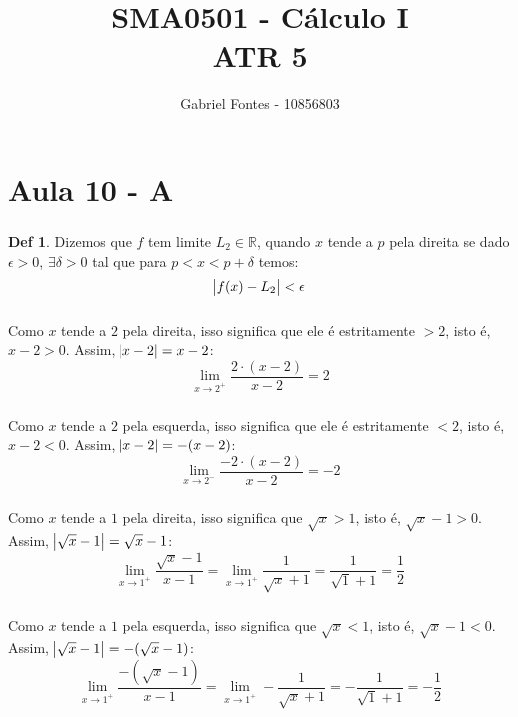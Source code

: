 \documentclass[12pt]{article}
\title{SMA0501 - Cálculo I \\ ATR 5}%
\author{Gabriel Fontes - 10856803}%
\theoremstyle{definition}
\newtheorem*{definition}{Def}
\begin{document}
\maketitle
\part*{Aula 10 - A}%
\section{}
\subsection{}
\begin{definition}
	Dizemos que \(f\) tem limite \(L_2 \in \mathbb{R}\), quando \(x\) tende a \(p\) pela direita se dado \(\epsilon > 0\), \(\exists \delta > 0\) tal que para \(p < x < p+\delta\) temos:
	\[
		\abs{f(x) - L_2} < \epsilon
	\]
\end{definition}

\subsection{}
\subsubsection{}
Como \(x\) tende a \(2\) pela direita, isso significa que ele é estritamente \(> 2\), isto é, \(x-2 > 0\). Assim, \(\abs{x-2} = x-2\):
\[
	\lim_{x\rightarrow2^+} \frac{2\cdot(x-2)}{x-2} = 2
\]
\subsubsection{}
Como \(x\) tende a \(2\) pela esquerda, isso significa que ele é estritamente \(< 2\), isto é, \(x-2 < 0\). Assim, \(\abs{x-2} = -(x-2)\):
\[
	\lim_{x\rightarrow2^-} \frac{-2\cdot(x-2)}{x-2} = -2
\]
\subsubsection{}
Como \(x\) tende a \(1\) pela direita, isso significa que \(\sqrt{x} > 1\), isto é, \(\sqrt{x}-1 > 0\). Assim, \(\abs{\sqrt{x}-1} = \sqrt{x} -1\):
\[
	\lim_{x \rightarrow 1^+} \frac{\sqrt{x}-1}{x-1} = \lim_{x \rightarrow 1^+} \frac{1}{\sqrt{x}+1} = \frac{1}{\sqrt{1}+1} = \frac{1}{2}
\]
\subsubsection{}
Como \(x\) tende a \(1\) pela esquerda, isso significa que \(\sqrt{x} < 1\), isto é, \(\sqrt{x}-1 < 0\). Assim, \(\abs{\sqrt{x}-1} = -(\sqrt{x} -1)\):
\[
	\lim_{x \rightarrow 1^+} \frac{-(\sqrt{x}-1)}{x-1} = \lim_{x \rightarrow 1^+} -\frac{1}{\sqrt{x}+1} = -\frac{1}{\sqrt{1}+1} = -\frac{1}{2}
\]
\end{document}
